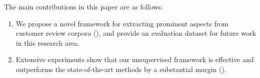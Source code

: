 The main contributions in this paper are as follows:
\begin{enumerate}
	\item We propose a novel framework for extracting prominent aspects 
	from customer review corpora (), and provide an evaluation dataset for future work in this research area.
	\item Extensive experiments show that our unsupervised framework is effective and 
	outperforms the state-of-the-art methods by a substantial margin ().
\end{enumerate}